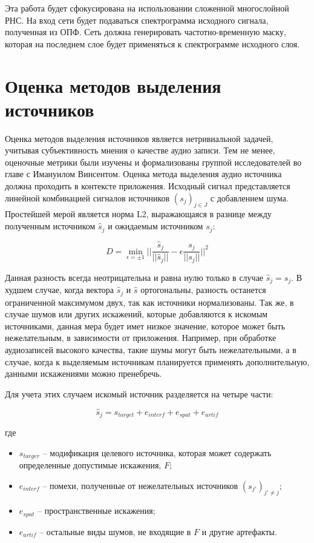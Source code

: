 Эта работа будет сфокусирована на использовании сложенной многослойной РНС. На вход сети будет подаваться спектрограмма исходного сигнала, полученная из ОПФ. Сеть должна генерировать частотно-временную маску, которая на последнем слое будет применяться к спектрограмме исходного слоя.

\section{Оценка методов выделения источников}

Оценка методов выделения источников является нетривиальной задачей, учитывая субъективность мнения о качестве аудио записи. Тем не менее, оценочные метрики были изучены и формализованы группой исследователей во главе с Имануилом Винсентом\cite{Vincent}.
Оценка метода выделения аудио источника должна проходить в контексте приложения. Исходный сигнал представляется линейной комбинацией сигналов источников $(s_j)_{j\in J}$ с добавлением шума. Простейшей мерой является норма L2, выражающаяся в разнице между полученным источником $\hat{s}_j$ и ожидаемым источником $s_j$:

\begin{equation}
D = \min_{\epsilon=\pm 1} \Bigg | \Bigg | \frac{\hat{s}_j}{||\hat{s}_j||} - \epsilon \frac{s_j}{||s_j||} \Bigg | \Bigg |^2
\end{equation}

Данная разность всегда неотрицательна и равна нулю только в случае $\hat{s}_j = s_j$. В худшем случае, когда вектора $\hat{s}_j$ и $\hat{s}$ ортогональны, разность останется ограниченной максимумом двух, так как источники нормализованы. Так же, в случае шумов или других искажений, которые добавляются к искомым источниками, данная мера будет имет низкое значение, которое может быть нежелательным, в зависимости от приложения. Например, при обработке аудиозаписей высокого качества, такие шумы могут быть нежелательными, а в случае, когда к выделяемым источникам планируется применять дополнительную, данными искажениями можно пренебречь.

Для учета этих случаем искомый источник разделяется на четыре части:

\begin{equation}
\hat{s}_j = s_{target} + e_{interf} + e_{spat} + e_{artif}
\label{anal:source}
\end{equation}

где

\begin{itemize}
	\item $s_{targer}$ -- модификация целевого источника, которая может содержать определенные допустимые искажения, $F$;
	\item $e_{interf}$ -- помехи, полученные от нежелательных источников $(s_{j'})_{j' \neq j}$;
	\item $e_{spat}$ -- пространственные искажения;
	\item $e_{artif}$ -- остальные виды шумов, не входящие в $F$ и другие артефакты.
\end{itemize}

